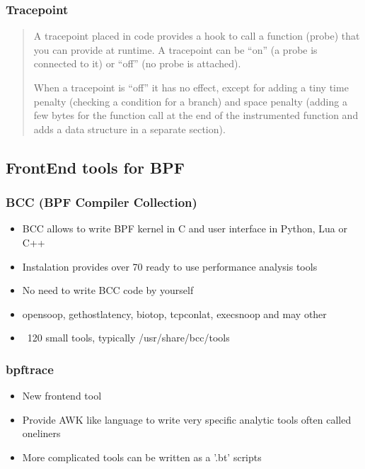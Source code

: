 \documentclass{beamer}
\begin{document}
\begin{frame}
  \frametitle{Tracepoint}
  \begin{quotation}
    \small A tracepoint placed in code provides a hook to call a function (probe) that you can provide at runtime. A tracepoint can be “on” (a probe is connected to it) or “off” (no probe is attached). 
   
    \small When a tracepoint is “off” it has no effect, except for adding a tiny time penalty (checking a condition for a branch) and space penalty (adding a few bytes for the function call at the end of the instrumented function and adds a data structure in a separate section). 
  \end{quotation}
\end{frame}


\subsection{FrontEnd tools for BPF}
\begin{frame}
  \frametitle{BCC (BPF Compiler Collection)}
  \begin{itemize}
    \item<1-> BCC allows to write BPF kernel in C and user interface in Python, Lua or C++
    \item<2-> Instalation provides over 70 ready to use performance analysis tools
    \item<3-> No need to write BCC code by yourself
    \item<4-> opensoop, gethostlatency, biotop, tcpconlat, execsnoop and may other
    \item<5-> ~120 small tools, typically /usr/share/bcc/tools
  \end{itemize}
\end{frame}

\begin{frame}
  \begin{figure}
    \centering
		\noindent{}
  \end{figure}
\end{frame}

\begin{frame}
  \frametitle{bpftrace}
  \begin{itemize}
    \item<1-> New frontend tool
    \item<2-> Provide AWK like language to write very specific analytic tools often called oneliners
    \item<3-> More complicated tools can be written as a '.bt' scripts
  \end{itemize}
\end{frame}
\end{document}
